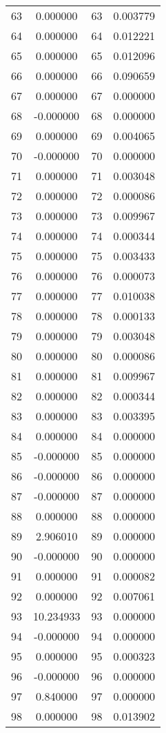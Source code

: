 \documentclass[12pt]{article}
\begin{document}
\begin{longtable}{@{}cccc@{}}
63 & 0.000000 & 63 & 0.003779 \\
64 & 0.000000 & 64 & 0.012221 \\
65 & 0.000000 & 65 & 0.012096 \\
66 & 0.000000 & 66 & 0.090659 \\
67 & 0.000000 & 67 & 0.000000 \\
68 & -0.000000 & 68 & 0.000000 \\
69 & 0.000000 & 69 & 0.004065 \\
70 & -0.000000 & 70 & 0.000000 \\
71 & 0.000000 & 71 & 0.003048 \\
72 & 0.000000 & 72 & 0.000086 \\
73 & 0.000000 & 73 & 0.009967 \\
74 & 0.000000 & 74 & 0.000344 \\
75 & 0.000000 & 75 & 0.003433 \\
76 & 0.000000 & 76 & 0.000073 \\
77 & 0.000000 & 77 & 0.010038 \\
78 & 0.000000 & 78 & 0.000133 \\
79 & 0.000000 & 79 & 0.003048 \\
80 & 0.000000 & 80 & 0.000086 \\
81 & 0.000000 & 81 & 0.009967 \\
82 & 0.000000 & 82 & 0.000344 \\
83 & 0.000000 & 83 & 0.003395 \\
84 & 0.000000 & 84 & 0.000000 \\
85 & -0.000000 & 85 & 0.000000 \\
86 & -0.000000 & 86 & 0.000000 \\
87 & -0.000000 & 87 & 0.000000 \\
88 & 0.000000 & 88 & 0.000000 \\
89 & 2.906010 & 89 & 0.000000 \\
90 & -0.000000 & 90 & 0.000000 \\
91 & 0.000000 & 91 & 0.000082 \\
92 & 0.000000 & 92 & 0.007061 \\
93 & 10.234933 & 93 & 0.000000 \\
94 & -0.000000 & 94 & 0.000000 \\
95 & 0.000000 & 95 & 0.000323 \\
96 & -0.000000 & 96 & 0.000000 \\
97 & 0.840000 & 97 & 0.000000 \\
98 & 0.000000 & 98 & 0.013902 \\

\end{longtable}
\end{document}
